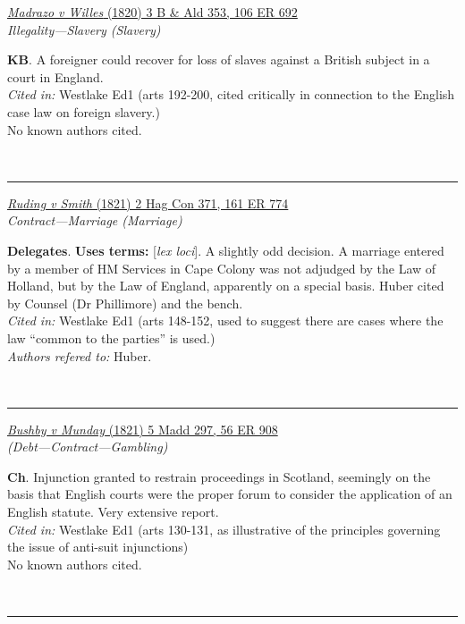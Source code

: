 \documentclass[twoside]{article}
\begin{document}
        \begin{small}
        \begin{center}
        \href{https://heinonline.org/HOL/P?h=hein.engrep/engrf0106&i=694}{\textit{Madrazo v Willes} (1820) 3 B \& Ald 353, 106 ER 692} \label{76} \\ 
\textit{Illegality---Slavery (Slavery)}\\
        \end{center}
        \textbf{KB}. A foreigner could recover for loss of slaves against a British subject in a court in England.\\\textit{Cited in: }Westlake Ed1 (arts 192-200, cited critically in connection to the English case law on foreign slavery.)\\No known authors cited.
        \end{small}\\
        \rule{\textwidth}{0.5pt}
        

        \begin{small}
        \begin{center}
        \href{https://heinonline.org/HOL/P?h=hein.engrep/engri0161&i=780}{\textit{Ruding v Smith} (1821) 2 Hag Con 371, 161 ER 774} \label{53} \\ 
\textit{Contract---Marriage (Marriage)}\\
        \end{center}
        \textbf{Delegates}.  \textbf{Uses terms: }[\textit{lex loci}]. A slightly odd decision. A marriage entered by a member of HM Services in Cape Colony was not adjudged by the Law of Holland, but by the Law of England, apparently on a special basis. Huber cited by Counsel (Dr Phillimore) and the bench.\\\textit{Cited in: }Westlake Ed1 (arts 148-152, used to suggest there are cases where the law “common to the parties” is used.)\\\textit{Authors refered to: }Huber.
        \end{small}\\
        \rule{\textwidth}{0.5pt}
        

        \begin{small}
        \begin{center}
        \href{https://heinonline.org/HOL/P?h=hein.engrep/engre0056&i=916}{\textit{Bushby v Munday} (1821) 5 Madd 297, 56 ER 908} \label{62} \\ 
\textit{ (Debt---Contract---Gambling)}\\
        \end{center}
        \textbf{Ch}. Injunction granted to restrain proceedings in Scotland, seemingly on the basis that English courts were the proper forum to consider the application of an English statute. Very extensive report.\\\textit{Cited in: }Westlake Ed1 (arts 130-131, as illustrative of the principles governing the issue of anti-suit injunctions)\\No known authors cited.
        \end{small}\\
        \rule{\textwidth}{0.5pt}
        
\end{document}
